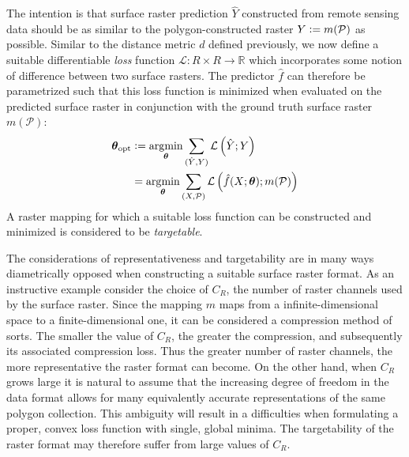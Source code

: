 \begin{description}[style=nextline]
    The intention is that surface raster prediction $\hat{Y}$ constructed from remote sensing data should be as similar to the polygon-constructed raster $Y \vcentcolon= m(\mathcal{P})$ as possible.
    Similar to the distance metric $d$ defined previously, we now define a suitable differentiable \textit{loss} function $\mathcal{L}: R \times R \rightarrow \mathbb{R}$ which incorporates some notion of difference between two surface rasters.
    The predictor $\hat{f}$ can therefore be parametrized such that this loss function is minimized when evaluated on the predicted surface raster in conjunction with the ground truth surface raster $m(\mathcal{P})$:
    \begin{align*}
      \boldsymbol{\theta}_{\mathrm{opt}}
      &\vcentcolon=
      \operatorname*{\arg\!\min}_{\boldsymbol{\theta}}
      \sum_{(\hat{Y}, Y)}
      \mathcal{L}\left(
        \hat{Y};
        Y
      \right)
      \\
      &=
      \operatorname*{\arg\!\min}_{\boldsymbol{\theta}}
      \sum_{(X, \mathcal{P})}
      \mathcal{L}\left(
        \hat{f}(X; \boldsymbol{\theta});
        m(\mathcal{P})
      \right)
    \end{align*}
    A raster mapping for which a suitable loss function can be constructed and minimized is considered to be \textit{targetable}.
\end{description}
The considerations of representativeness and targetability are in many ways diametrically opposed when constructing a suitable surface raster format.
As an instructive example consider the choice of $C_R$, the number of raster channels used by the surface raster.
Since the mapping $m$ maps from a infinite-dimensional space to a finite-dimensional one, it can be considered a compression method of sorts.
The smaller the value of $C_R$, the greater the compression, and subsequently its associated compression loss.
Thus the greater number of raster channels, the more representative the raster format can become.
On the other hand, when $C_R$ grows large it is natural to assume that the increasing degree of freedom in the data format allows for many equivalently accurate representations of the same polygon collection.
This ambiguity will result in a difficulties when formulating a proper, convex loss function with single, global minima.
The targetability of the raster format may therefore suffer from large values of $C_R$.

